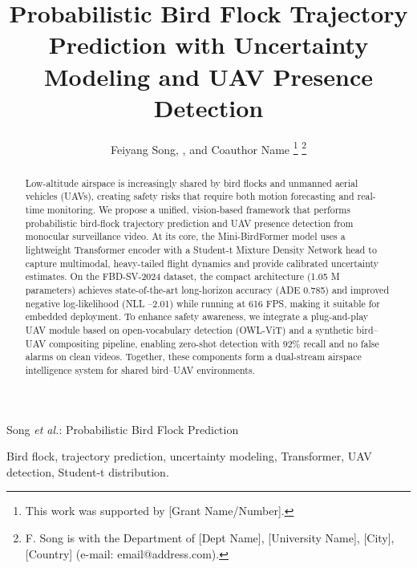\documentclass[journal]{IEEEtran}
\begin{document}
	
	\title{Probabilistic Bird Flock Trajectory Prediction with Uncertainty Modeling and UAV Presence Detection}
	
	\author{Feiyang Song, , and Coauthor Name
		\thanks{This work was supported by [Grant Name/Number].}
		\thanks{F. Song is with the Department of [Dept Name], [University Name], [City], [Country] (e-mail: email@address.com).}}
	
	{Song \MakeLowercase{\textit{et al.}}: Probabilistic Bird Flock Prediction}
	
	\maketitle
	
\begin{abstract}
	Low-altitude airspace is increasingly shared by bird flocks and unmanned aerial vehicles (UAVs), creating safety risks that require both motion forecasting and real-time monitoring. We propose a unified, vision-based framework that performs probabilistic bird-flock trajectory prediction and UAV presence detection from monocular surveillance video. At its core, the Mini-BirdFormer model uses a lightweight Transformer encoder with a Student-t Mixture Density Network head to capture multimodal, heavy-tailed flight dynamics and provide calibrated uncertainty estimates. On the FBD-SV-2024 dataset, the compact architecture (1.05 M parameters) achieves state-of-the-art long-horizon accuracy (ADE 0.785) and improved negative log-likelihood (NLL --2.01) while running at 616 FPS, making it suitable for embedded deployment. To enhance safety awareness, we integrate a plug-and-play UAV module based on open-vocabulary detection (OWL-ViT) and a synthetic bird--UAV compositing pipeline, enabling zero-shot detection with 92\% recall and no false alarms on clean videos. Together, these components form a dual-stream airspace intelligence system for shared bird--UAV environments.
\end{abstract}

	
	\begin{IEEEkeywords}
		Bird flock, trajectory prediction, uncertainty modeling, Transformer, UAV detection, Student-t distribution.
	\end{IEEEkeywords}
	
\end{document}
